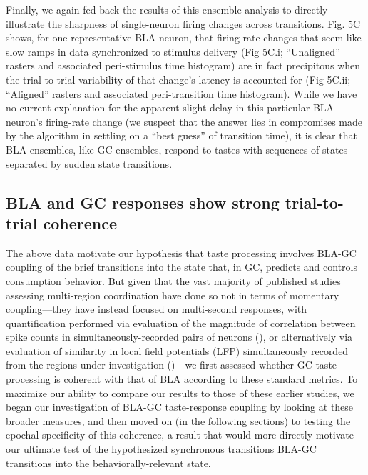 \begin{refsection}
Finally, we again fed back the results of this ensemble analysis to directly illustrate the sharpness of single-neuron firing changes across transitions. Fig. 5C shows, for one representative BLA neuron, that firing-rate changes that seem like slow ramps in data synchronized to stimulus delivery (Fig 5C.i; “Unaligned” rasters and associated peri-stimulus time histogram) are in fact precipitous when the trial-to-trial variability of that change’s latency is accounted for (Fig 5C.ii; “Aligned” rasters and associated peri-transition time histogram). While we have no current explanation for the apparent slight delay in this particular BLA neuron’s firing-rate change (we suspect that the answer lies in compromises made by the algorithm in settling on a “best guess” of transition time), it is clear that BLA ensembles, like GC ensembles, respond to tastes with sequences of states separated by sudden state transitions.

\subsection{BLA and GC responses show strong trial-to-trial coherence}
The above data motivate our hypothesis that taste processing involves BLA-GC coupling of the brief transitions into the state that, in GC, predicts and controls consumption behavior. But given that the vast majority of published studies assessing multi-region coordination have done so not in terms of momentary coupling—they have instead focused on multi-second responses, with quantification performed via evaluation of the magnitude of correlation between spike counts in simultaneously-recorded pairs of neurons (\cite{averbeck2006a,averbeck2006b}), or alternatively via evaluation of similarity in local field potentials (LFP) simultaneously recorded from the regions under investigation (\cite{place2016a})—we first assessed whether GC taste processing is coherent with that of BLA according to these standard metrics. To maximize our ability to compare our results to those of these earlier studies, we began our investigation of BLA-GC taste-response coupling by looking at these broader measures, and then moved on (in the following sections) to testing the epochal specificity of this coherence, a result that would more directly motivate our ultimate test of the hypothesized synchronous transitions BLA-GC transitions into the behaviorally-relevant state.


\end{refsection}
